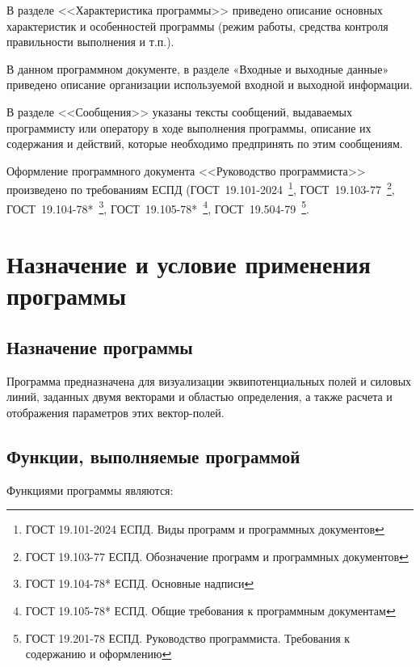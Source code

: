 \documentclass[14pt,a4paper,final]{extreport}
\begin{document}
В разделе <<Характеристика программы>> приведено описание основных
характеристик и особенностей программы (режим работы, средства контроля
правильности выполнения и т.п.).

В данном программном документе, в разделе «Входные и выходные данные»
приведено описание организации используемой входной и выходной информации.

В разделе <<Сообщения>> указаны тексты сообщений, выдаваемых
программисту или оператору в ходе выполнения программы, описание их
содержания и действий, которые необходимо предпринять по этим сообщениям.

Оформление программного документа <<Руководство программиста>> произведено по требованиям ЕСПД (ГОСТ~19.101-2024~\footnote{ГОСТ 19.101-2024 ЕСПД. Виды программ и программных документов}, 
ГОСТ~19.103-77~\footnote{ГОСТ 19.103-77 ЕСПД. Обозначение программ и программных документов}, 
ГОСТ~19.104-78*~\footnote{ГОСТ 19.104-78* ЕСПД. Основные надписи}, 
ГОСТ~19.105-78*~\footnote{ГОСТ 19.105-78* ЕСПД. Общие требования к программным документам},
ГОСТ~19.504-79~\footnote{ГОСТ 19.201-78 ЕСПД. Руководство программиста. Требования к содержанию и оформлению}.

\pagebreak


\tableofcontents

\pagebreak

\chapter{Назначение и условие применения программы}
\section{Назначение программы}

Программа предназначена для визуализации эквипотенциальных полей и силовых линий, заданных двумя векторами и областью определения, а также расчета и отображения параметров этих вектор-полей.

\section{Функции, выполняемые программой}

Функциями программы являются:
\end{document}
